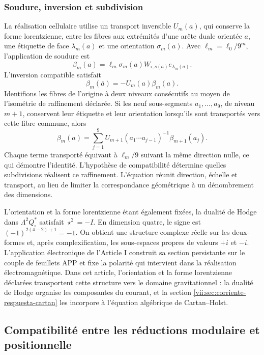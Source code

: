 \subsubsection{Soudure, inversion et subdivision}

La réalisation cellulaire utilise un transport inversible \(U_m(a)\),
qui conserve la forme lorentzienne, entre les fibres aux extrémités d'une
arête duale orientée \(a\), une étiquette
de face \(\lambda_m(a)\) et une orientation \(\sigma_m(a)\).
Avec \(\ell_m=\ell_0/9^m\), l'application de soudure est
\[
 \beta_m(a)=\ell_m\sigma_m(a)
 W_{\square,s(a)}e_{\lambda_m(a)}.
\]
L'inversion compatible satisfait
\[
 \beta_m(\bar a)=-U_m(a)\beta_m(a).
\]
Identifions les fibres de l'origine à deux niveaux consécutifs au moyen de l'isométrie de raffinement déclarée. Si les neuf sous-segments \(a_1,\ldots,a_9\), de niveau \(m+1\), conservent leur étiquette et leur orientation lorsqu'ils sont transportés vers cette fibre commune, alors
\begin{equation}
 \beta_m(a)=\sum_{j=1}^9
 U_{m+1}(a_1\cdots a_{j-1})^{-1}\beta_{m+1}(a_j).
 \label{eq:soldadura-refinamiento}
\end{equation}
Chaque terme transporté équivaut à \(\ell_m/9\) suivant la même
direction nulle, ce qui démontre l'identité. L'hypothèse de
compatibilité détermine quelles subdivisions réalisent ce raffinement.
L'équation réunit direction, échelle et transport, au lieu de limiter
la correspondance géométrique à un dénombrement des dimensions.

L'orientation et la forme lorentzienne étant également fixées, la dualité de
Hodge dans \(\Lambda^2Q_\square^*\) satisfait \(\star^2=-I\).
En dimension quatre, le signe est \((-1)^{2(4-2)+1}=-1\).
On obtient une structure complexe réelle sur les deux-formes et,
après complexification, les sous-espaces propres de valeurs \(+i\) et
\(-i\). L'application électronique de l'Article I construit sa section
persistante sur le couple de feuillets APP et fixe la polarité qui intervient dans
la réalisation électromagnétique. Dans cet article, l'orientation et la forme
lorentzienne déclarées transportent cette structure vers le domaine gravitationnel :
la dualité de Hodge organise les composantes du courant, et la section
\ref{vii:sec:corriente-respuesta-cartan} les incorpore à l'équation
algébrique de Cartan--Holst.

\subsection{Compatibilité entre les réductions modulaire et positionnelle}

